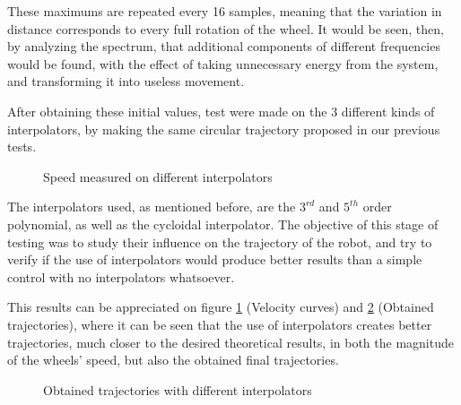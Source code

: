 \documentclass[a4paper]{aadeca}
\makeatletter
\newenvironment{customlegend}[1][]{%
    \begingroup
    \csname pgfplots@init@cleared@structures\endcsname
    \pgfplotsset{#1}%
}{%
    \csname pgfplots@createlegend\endcsname
    \endgroup
}%
\def\addlegendimage{\csname pgfplots@addlegendimage\endcsname}
\makeatother
\begin{document}
These maximums are repeated every 16 samples, meaning that the variation in distance corresponds to every full rotation of the wheel.
It would be seen, then, by analyzing the spectrum, that additional components of different frequencies would be found, with the effect of taking unnecessary energy from the system, and transforming it into useless movement.

After obtaining these initial values, test were made on the 3 different kinds of interpolators, by making the same circular trajectory proposed in our previous tests.

\begin{figure}[h]
\centering
\noindent\resizebox{0.8\columnwidth}{!}{
}
\noindent\resizebox{0.8\columnwidth}{!}{
}
\noindent\resizebox{0.8\columnwidth}{!}{
}
\caption{Speed measured on different interpolators}
\label{fig:vel}
\end{figure}

The interpolators used, as mentioned before, are the $3^{rd}$ and $5^{th}$ order polynomial, as well as the cycloidal interpolator.
The objective of this stage of testing was to study their influence on the trajectory of the robot, and try to verify if the use of interpolators would produce better results than a simple control with no interpolators whatsoever.

This results can be appreciated on figure \ref{fig:vel} (Velocity curves) and \ref{fig:trayint} (Obtained trajectories), where it can be seen that the use of interpolators creates better trajectories, much closer to the desired theoretical results, in both the magnitude of the wheels' speed, but also the obtained final trajectories.

\begin{figure}[h]
\centering
\noindent\resizebox{0.8\columnwidth}{!}{
}
\caption{Obtained trajectories with different interpolators}
\label{fig:trayint}
\end{figure}
\end{document}
